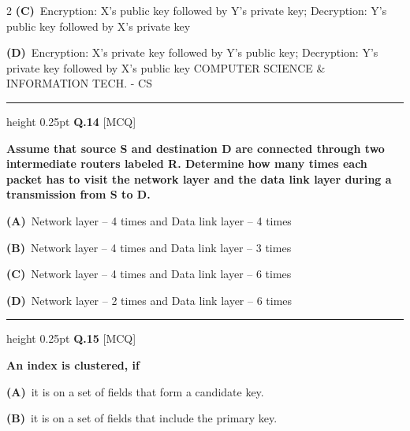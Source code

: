 \documentclass[a4paper,10pt,twoside]{article}
\begin{document}
\begin{multicols}{2}
\textbf{(C)}~Encryption: X's public key followed by Y's private key; Decryption: Y's public key followed \newline by X's private key\par\vspace{2pt}\noindent
\textbf{(D)}~Encryption: X's private key followed by Y's public key; Decryption: Y's private key followed \newline by X's public key  COMPUTER SCIENCE \& INFORMATION TECH. - CS
\par\vspace{6pt}\hrule height 0.25pt\vspace{6pt}
\noindent\textbf{Q.14} \hfill {\footnotesize\textsf{[MCQ]}}
\par\vspace{2pt}
{\bfseries Assume that source S and destination D are connected through two intermediate routers labeled R.
Determine how many times each packet has to visit the network layer and the data link layer during
a transmission from S to D. \par}
\par\vspace{2pt}\noindent
\textbf{(A)}~Network layer -- 4 times and Data link layer -- 4 times\par\vspace{2pt}\noindent
\textbf{(B)}~Network layer -- 4 times and Data link layer -- 3 times\par\vspace{2pt}\noindent
\textbf{(C)}~Network layer -- 4 times and Data link layer -- 6 times\par\vspace{2pt}\noindent
\textbf{(D)}~Network layer -- 2 times and Data link layer -- 6 times
\par\vspace{6pt}\hrule height 0.25pt\vspace{6pt}
\noindent\textbf{Q.15} \hfill {\footnotesize\textsf{[MCQ]}}
\par\vspace{2pt}
{\bfseries An index is clustered, if \par}
\par\vspace{2pt}\noindent
\textbf{(A)}~it is on a set of fields that form a candidate key.\par\vspace{2pt}\noindent
\textbf{(B)}~it is on a set of fields that include the primary key.\par\vspace{2pt}\noindent

\end{multicols}
\end{document}
